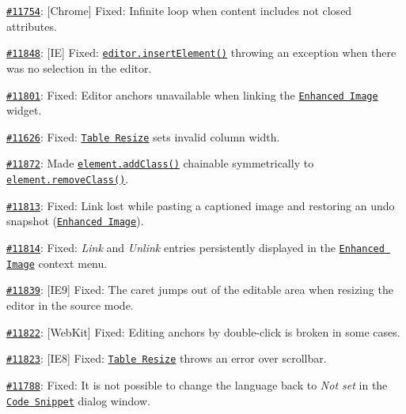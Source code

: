 \begin{DoxyItemize}
\item \href{http://dev.ckeditor.com/ticket/11754}{\tt \#11754}\+: \mbox{[}Chrome\mbox{]} Fixed\+: Infinite loop when content includes not closed attributes.
\item \href{http://dev.ckeditor.com/ticket/11848}{\tt \#11848}\+: \mbox{[}IE\mbox{]} Fixed\+: \href{http://docs.ckeditor.com/#!/api/CKEDITOR.editor-method-insertElement}{\tt {\ttfamily editor.\+insert\+Element()}} throwing an exception when there was no selection in the editor.
\item \href{http://dev.ckeditor.com/ticket/11801}{\tt \#11801}\+: Fixed\+: Editor anchors unavailable when linking the \href{http://ckeditor.com/addon/image2}{\tt Enhanced Image} widget.
\item \href{http://dev.ckeditor.com/ticket/11626}{\tt \#11626}\+: Fixed\+: \href{http://ckeditor.com/addon/tableresize}{\tt Table Resize} sets invalid column width.
\item \href{http://dev.ckeditor.com/ticket/11872}{\tt \#11872}\+: Made \href{http://docs.ckeditor.com/#!/api/CKEDITOR.dom.element-method-addClass}{\tt {\ttfamily element.\+add\+Class()}} chainable symmetrically to \href{http://docs.ckeditor.com/#!/api/CKEDITOR.dom.element-method-removeClass}{\tt {\ttfamily element.\+remove\+Class()}}.
\item \href{http://dev.ckeditor.com/ticket/11813}{\tt \#11813}\+: Fixed\+: Link lost while pasting a captioned image and restoring an undo snapshot (\href{http://ckeditor.com/addon/image2}{\tt Enhanced Image}).
\item \href{http://dev.ckeditor.com/ticket/11814}{\tt \#11814}\+: Fixed\+: {\itshape Link} and {\itshape Unlink} entries persistently displayed in the \href{http://ckeditor.com/addon/image2}{\tt Enhanced Image} context menu.
\item \href{http://dev.ckeditor.com/ticket/11839}{\tt \#11839}\+: \mbox{[}I\+E9\mbox{]} Fixed\+: The caret jumps out of the editable area when resizing the editor in the source mode.
\item \href{http://dev.ckeditor.com/ticket/11822}{\tt \#11822}\+: \mbox{[}Web\+Kit\mbox{]} Fixed\+: Editing anchors by double-\/click is broken in some cases.
\item \href{http://dev.ckeditor.com/ticket/11823}{\tt \#11823}\+: \mbox{[}I\+E8\mbox{]} Fixed\+: \href{http://ckeditor.com/addon/tableresize}{\tt Table Resize} throws an error over scrollbar.
\item \href{http://dev.ckeditor.com/ticket/11788}{\tt \#11788}\+: Fixed\+: It is not possible to change the language back to {\itshape Not set} in the \href{http://ckeditor.com/addon/codesnippet}{\tt Code Snippet} dialog window.

\end{DoxyItemize}
